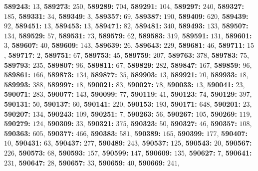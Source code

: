 \textsf{\bfseries 589243:} $13$, \textsf{\bfseries 589273:} $250$, \textsf{\bfseries 589289:} $704$, \textsf{\bfseries 589291:} $104$, \textsf{\bfseries 589297:} $240$, \textsf{\bfseries 589327:} $185$, \textsf{\bfseries 589331:} $34$, \textsf{\bfseries 589349:} $3$, \textsf{\bfseries 589357:} $69$, \textsf{\bfseries 589387:} $190$, \textsf{\bfseries 589409:} $620$, \textsf{\bfseries 589439:} $92$, \textsf{\bfseries 589451:} $13$, \textsf{\bfseries 589453:} $13$, \textsf{\bfseries 589471:} $82$, \textsf{\bfseries 589481:} $340$, \textsf{\bfseries 589493:} $133$, \textsf{\bfseries 589507:} $134$, \textsf{\bfseries 589529:} $57$, \textsf{\bfseries 589531:} $73$, \textsf{\bfseries 589579:} $62$, \textsf{\bfseries 589583:} $319$, \textsf{\bfseries 589591:} $131$, \textsf{\bfseries 589601:} $3$, \textsf{\bfseries 589607:} $40$, \textsf{\bfseries 589609:} $143$, \textsf{\bfseries 589639:} $26$, \textsf{\bfseries 589643:} $229$, \textsf{\bfseries 589681:} $46$, \textsf{\bfseries 589711:} $15$, \textsf{\bfseries 589717:} $2$, \textsf{\bfseries 589751:} $67$, \textsf{\bfseries 589753:} $45$, \textsf{\bfseries 589759:} $207$, \textsf{\bfseries 589763:} $378$, \textsf{\bfseries 589783:} $75$, \textsf{\bfseries 589793:} $235$, \textsf{\bfseries 589807:} $96$, \textsf{\bfseries 589811:} $67$, \textsf{\bfseries 589829:} $282$, \textsf{\bfseries 589847:} $167$, \textsf{\bfseries 589859:} $96$, \textsf{\bfseries 589861:} $166$, \textsf{\bfseries 589873:} $134$, \textsf{\bfseries 589877:} $35$, \textsf{\bfseries 589903:} $13$, \textsf{\bfseries 589921:} $70$, \textsf{\bfseries 589933:} $18$, \textsf{\bfseries 589993:} $388$, \textsf{\bfseries 589997:} $18$, \textsf{\bfseries 590021:} $83$, \textsf{\bfseries 590027:} $78$, \textsf{\bfseries 590033:} $13$, \textsf{\bfseries 590041:} $23$, \textsf{\bfseries 590071:} $283$, \textsf{\bfseries 590077:} $143$, \textsf{\bfseries 590099:} $77$, \textsf{\bfseries 590119:} $41$, \textsf{\bfseries 590123:} $74$, \textsf{\bfseries 590129:} $397$, \textsf{\bfseries 590131:} $50$, \textsf{\bfseries 590137:} $60$, \textsf{\bfseries 590141:} $220$, \textsf{\bfseries 590153:} $193$, \textsf{\bfseries 590171:} $648$, \textsf{\bfseries 590201:} $23$, \textsf{\bfseries 590207:} $134$, \textsf{\bfseries 590243:} $109$, \textsf{\bfseries 590251:} $7$, \textsf{\bfseries 590263:} $56$, \textsf{\bfseries 590267:} $105$, \textsf{\bfseries 590269:} $119$, \textsf{\bfseries 590279:} $124$, \textsf{\bfseries 590309:} $33$, \textsf{\bfseries 590321:} $375$, \textsf{\bfseries 590323:} $50$, \textsf{\bfseries 590327:} $46$, \textsf{\bfseries 590357:} $108$, \textsf{\bfseries 590363:} $605$, \textsf{\bfseries 590377:} $466$, \textsf{\bfseries 590383:} $581$, \textsf{\bfseries 590389:} $165$, \textsf{\bfseries 590399:} $177$, \textsf{\bfseries 590407:} $10$, \textsf{\bfseries 590431:} $63$, \textsf{\bfseries 590437:} $277$, \textsf{\bfseries 590489:} $243$, \textsf{\bfseries 590537:} $125$, \textsf{\bfseries 590543:} $20$, \textsf{\bfseries 590567:} $226$, \textsf{\bfseries 590573:} $68$, \textsf{\bfseries 590593:} $157$, \textsf{\bfseries 590599:} $147$, \textsf{\bfseries 590609:} $135$, \textsf{\bfseries 590627:} $7$, \textsf{\bfseries 590641:} $231$, \textsf{\bfseries 590647:} $28$, \textsf{\bfseries 590657:} $33$, \textsf{\bfseries 590659:} $40$, \textsf{\bfseries 590669:} $241$, 
